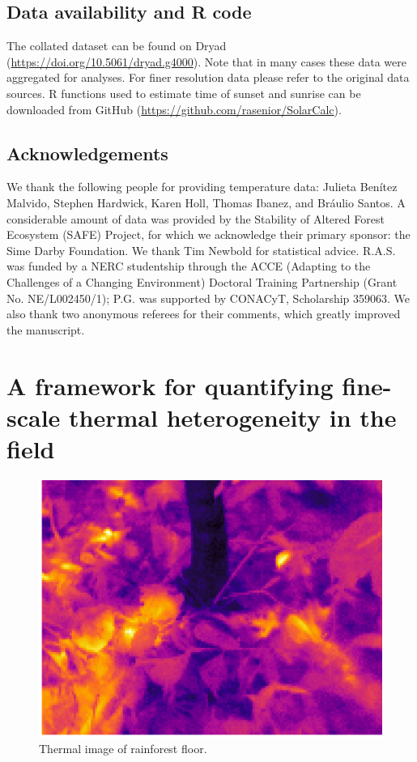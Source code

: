 \documentclass[12pt,a4paper,]{report}
\theoremstyle{definition}
\theoremstyle{definition}
\theoremstyle{definition}
\theoremstyle{remark}
\begin{document}
\section{Data availability and R
code}\label{data-availability-and-r-code}

The collated dataset can be found on Dryad
(\url{https://doi.org/10.5061/dryad.g4000}). Note that in many cases
these data were aggregated for analyses. For finer resolution data
please refer to the original data sources. R functions used to estimate
time of sunset and sunrise can be downloaded from GitHub
(\url{https://github.com/rasenior/SolarCalc}).

\section{Acknowledgements}\label{acknowledgements-1}

We thank the following people for providing temperature data: Julieta
Benítez Malvido, Stephen Hardwick, Karen Holl, Thomas Ibanez, and
Bráulio Santos. A considerable amount of data was provided by the
Stability of Altered Forest Ecosystem (SAFE) Project, for which we
acknowledge their primary sponsor: the Sime Darby Foundation. We thank
Tim Newbold for statistical advice. R.A.S. was funded by a NERC
studentship through the ACCE (Adapting to the Challenges of a Changing
Environment) Doctoral Training Partnership (Grant No. NE/L002450/1);
P.G. was supported by CONACyT, Scholarship 359063. We also thank two
anonymous referees for their comments, which greatly improved the
manuscript.

\chapter{A framework for quantifying fine-scale thermal heterogeneity in
the
field}\label{a-framework-for-quantifying-fine-scale-thermal-heterogeneity-in-the-field}

\begin{figure}[!htb]
\centering
\includegraphics[width=15cm]{pics/Themal-image1.png}
\caption*{Thermal image of rainforest floor.}
\end{figure}
\end{document}
